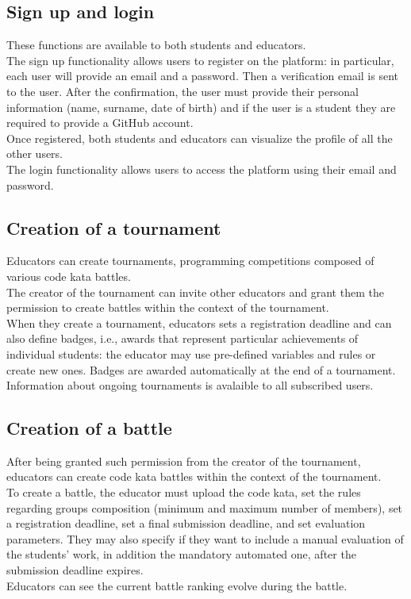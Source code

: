 \subsection{Sign up and login}
These functions are available to both students and educators.\\
The sign up functionality allows users to register on the platform: in particular, each user will provide an email 
and a password. Then a verification email is sent to the user.
After the confirmation, the user must provide their personal information (name, surname, date of birth) and 
if the user is a student they are required to provide a GitHub account.\\
Once registered, both students and educators can visualize the profile of all the other users.\\
The login functionality allows users to access the platform using their email and password.\\

\subsection{Creation of a tournament}
Educators can create tournaments, programming competitions composed of various code kata battles.\\
The creator of the tournament can invite other educators and grant them the permission to create battles within the 
context of the tournament.\\
When they create a tournament, educators sets a registration deadline and can also define badges, i.e., awards that 
represent particular achievements of individual students: the educator may use pre-defined variables and rules or create 
new ones. Badges are awarded automatically at the end of a tournament.\\
Information about ongoing tournaments is avalaible to all subscribed users.\\

\subsection{Creation of a battle}
After being granted such permission from the creator of the tournament, educators can create code kata battles within the
context of the tournament.\\
To create a battle, the educator must upload the code kata, set the rules regarding groups composition (minimum and maximum 
number of members), set a registration deadline, set a final submission deadline, and set evaluation parameters. They may also 
specify if they want to include a manual evaluation of the students' work, in addition the mandatory automated one, after the 
submission deadline expires.\\
Educators can see the current battle ranking evolve during the battle.\\

